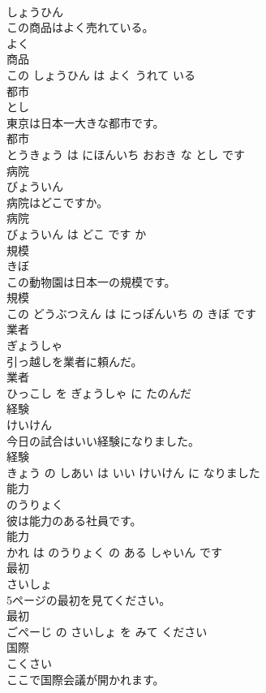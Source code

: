 \documentclass[8pt]{extreport}
\begin{document}
\begin{CJK}{UTF8}{min}
\\	しょうひん			
\\	この商品はよく売れている。	
\\	よく 
\\	商品 
\\	この しょうひん は よく うれて いる			
\\	都市	
\\	とし			
\\	東京は日本一大きな都市です。	
\\	都市 
\\	とうきょう は にほんいち おおき な とし です			
\\	病院	
\\	びょういん			
\\	病院はどこですか。	
\\	病院 
\\	びょういん は どこ です か			
\\	規模	
\\	きぼ			
\\	この動物園は日本一の規模です。	
\\	規模 
\\	この どうぶつえん は にっぽんいち の きぼ です			
\\	業者	
\\	ぎょうしゃ			
\\	引っ越しを業者に頼んだ。	
\\	業者 
\\	ひっこし を ぎょうしゃ に たのんだ			
\\	経験	
\\	けいけん			
\\	今日の試合はいい経験になりました。	
\\	経験 
\\	きょう の しあい は いい けいけん に なりました			
\\	能力	
\\	のうりょく			
\\	彼は能力のある社員です。	
\\	能力 
\\	かれ は のうりょく の ある しゃいん です			
\\	最初	
\\	さいしょ			
\\	5ページの最初を見てください。	
\\	最初 
\\	ごぺーじ の さいしょ を みて ください			
\\	国際	
\\	こくさい			
\\	ここで国際会議が開かれます。	

\end{CJK}
\end{document}
